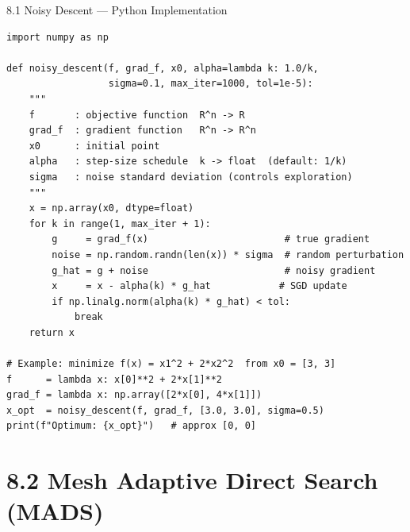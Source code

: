 \documentclass[aspectratio=169,10pt]{beamer}
\begin{document}
\begin{frame}[fragile]{8.1 Noisy Descent --- Python Implementation}
\begin{lstlisting}[caption={Noisy gradient descent (Python/NumPy)}]
import numpy as np

def noisy_descent(f, grad_f, x0, alpha=lambda k: 1.0/k,
                  sigma=0.1, max_iter=1000, tol=1e-5):
    """
    f       : objective function  R^n -> R
    grad_f  : gradient function   R^n -> R^n
    x0      : initial point
    alpha   : step-size schedule  k -> float  (default: 1/k)
    sigma   : noise standard deviation (controls exploration)
    """
    x = np.array(x0, dtype=float)
    for k in range(1, max_iter + 1):
        g     = grad_f(x)                        # true gradient
        noise = np.random.randn(len(x)) * sigma  # random perturbation
        g_hat = g + noise                        # noisy gradient
        x     = x - alpha(k) * g_hat            # SGD update
        if np.linalg.norm(alpha(k) * g_hat) < tol:
            break
    return x

# Example: minimize f(x) = x1^2 + 2*x2^2  from x0 = [3, 3]
f      = lambda x: x[0]**2 + 2*x[1]**2
grad_f = lambda x: np.array([2*x[0], 4*x[1]])
x_opt  = noisy_descent(f, grad_f, [3.0, 3.0], sigma=0.5)
print(f"Optimum: {x_opt}")   # approx [0, 0]
\end{lstlisting}
\end{frame}

\section{8.2 Mesh Adaptive Direct Search (MADS)}
\end{document}
